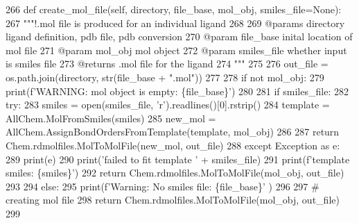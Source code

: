 \begin{DoxyCode}
266     \textcolor{keyword}{def }create\_mol\_file(self, directory, file\_base, mol\_obj, smiles\_file=None):
267         \textcolor{stringliteral}{"""!.mol file is produced for an individual ligand}
268 \textcolor{stringliteral}{}
269 \textcolor{stringliteral}{        @params directory ligand definition, pdb file, pdb conversion}
270 \textcolor{stringliteral}{        @param file\_base inital location of mol file }
271 \textcolor{stringliteral}{        @param mol\_obj mol object}
272 \textcolor{stringliteral}{        @param smiles\_file whether input is smiles file}
273 \textcolor{stringliteral}{        @returns .mol file for the ligand}
274 \textcolor{stringliteral}{        """}
275 
276         out\_file = os.path.join(directory, str(file\_base + \textcolor{stringliteral}{".mol"}))
277 
278         \textcolor{keywordflow}{if} \textcolor{keywordflow}{not} mol\_obj:
279             print(f\textcolor{stringliteral}{'WARNING: mol object is empty: \{file\_base\}'})
280 
281         \textcolor{keywordflow}{if} smiles\_file:
282             \textcolor{keywordflow}{try}:
283                 smiles = open(smiles\_file, \textcolor{stringliteral}{'r').readlines()[0].rstrip()}
284 \textcolor{stringliteral}{                template = AllChem.MolFromSmiles(smiles)}
285 \textcolor{stringliteral}{                new\_mol = AllChem.AssignBondOrdersFromTemplate(template, mol\_obj)}
286 \textcolor{stringliteral}{}
287 \textcolor{stringliteral}{                }\textcolor{keywordflow}{return} Chem.rdmolfiles.MolToMolFile(new\_mol, out\_file)
288             \textcolor{keywordflow}{except} Exception \textcolor{keyword}{as} e:
289                 print(e)
290                 print(\textcolor{stringliteral}{'failed to fit template '} + smiles\_file)
291                 print(f\textcolor{stringliteral}{'template smiles: \{smiles\}'})
292                 \textcolor{keywordflow}{return} Chem.rdmolfiles.MolToMolFile(mol\_obj, out\_file)
293 
294         \textcolor{keywordflow}{else}:
295             print(f\textcolor{stringliteral}{'Warning: No smiles file: \{file\_base\}'} )
296 
297         \textcolor{comment}{# creating mol file}
298         \textcolor{keywordflow}{return} Chem.rdmolfiles.MolToMolFile(mol\_obj, out\_file)
299 
\end{DoxyCode}
\mbox{\label{classfragalysis__api_1_1xcimporter_1_1conversion__pdb__mol_1_1_ligand_ada1d85b43009efb4da6cf5b17c851783}} 

